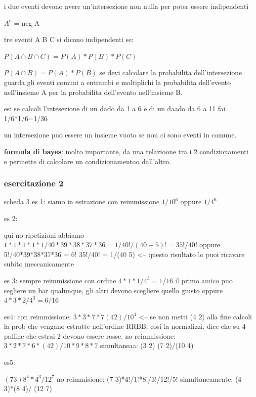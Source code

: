 \documentclass[12pt]{article}
\begin{document}
i due eventi devono avere un'intersezione non nulla per poter essere indipendenti

$A^c$ = neg A
 
tre eventi A B C si dicono indipendenti se: 

$P(A \cap B \cap C)=P(A)*P(B)*P(C)$

$P(A \cap B)= P(A)* P(B)$
se devi calcolare la probabilita dell'intersezione guarda gli eventi comuni a entrambi e moltiplichi la probabilita dell'evento nell'insieme A per la probabilita dell'evento nell'insieme B.

es: se calcoli l'intesezione di un dado da 1 a 6 e di un daado da 6 a 11 fai 1/6*1/6=1/36
 
un intersezione puo essere un insieme vuoto se non ci sono eventi in comune.


\textbf{formula di bayes}: molto importante, da una relazioone tra i 2 condizionamenti e permette di calcolare un condizionamentoo dall'altro.





\subsubsection{esercitazione 2}

scheda 3 es 1:
siamo in estrazione con reimmissione
$1/10^6$ oppure $1/4^6$

es 2:

qui no ripetizioni
abbiamo $1*1*1*1*1/40*39*38*37*36 = 1/40!/(40-5)! = 35!/40!$
oppure
       5!/40*39*38*37*36 = 6! 35!/40! = 1/(40 5) <-- questo risultato lo puoi ricavare subito meccanicamente

       es 3:
       sempre reimmissione con ordine  
        $4*1*1/4^3 = 1/16$ il primo amico puo segliere un bar qualunque, gli altri devono scegliere quello giusto
       oppure
        $4*3*2/4^3 = 6/16$

        es4:
         con reimmissione:
        $3*3*7*7(4 2)/10^4$ <-- se non metti (4 2) alla fine calcoli la prob che vengano estratte nell'ordine RRBB, cosi la normalizzi, dice che su 4 palline che estrai 2 devono essere rosse.
        no reimmissione:
        $3*2*7*6*(4 2)/10*9*8*7$
        simultaneaa:
        (3 2) (7 2)/(10 4)

        es5:

        $(7 3)8^4*4^3/12^7$
        no reimmisione:
        (7 3)*4!/1!*8!/3!/12!/5!
        simultaneamente:
        (4 3)*(8 4)/ (12 7)
\end{document}
